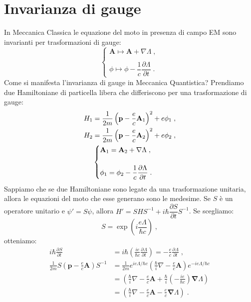 \documentclass[10pt,a4paper]{report}
\theoremstyle{definition}
\newcommand{\pdev}[3][]{\frac{\partial^{#1} #2}{\partial #3^{#1}}}
\numberwithin{equation}{section}
\newcommand{\bnabla}{\boldsymbol{\nabla}}
\begin{document}
\section{Invarianza di gauge}
In Meccanica Classica le equazione del moto in presenza di campo EM sono invarianti per trasformazioni di gauge:
\begin{equation}
\begin{cases}
\mathbf{A}\longmapsto \mathbf{A}+\nabla\Lambda\;, \\
\\
\phi\longmapsto \phi-\dfrac{1}{c}\dfrac{\partial\Lambda}{\partial t}\;.
\end{cases}
\end{equation}
Come si manifesta l'invarianza di gauge in Meccanica Quantistica? Prendiamo due Hamiltoniane di particella libera che differiscono per una trasformazione di gauge:
\begin{align}
H_1 &= \frac{1}{2m}\left(\mathbf{p}-\frac{e}{c}\mathbf{A}_1\right)^2+e\phi_1 \notag \;,\\
H_2 &= \frac{1}{2m}\left(\mathbf{p}-\frac{e}{c}\mathbf{A}_2\right)^2+e\phi_2 \notag\;, \\
&\begin{cases}
\mathbf{A}_1=\mathbf{A}_2+\nabla\Lambda\;, \\
\\
\phi_1=\phi_2-\dfrac{1}{c}\dfrac{\partial\Lambda}{\partial t}\;.
\end{cases}
\end{align}
Sappiamo che se due Hamiltoniane sono legate da una trasformazione unitaria, allora le equazioni del moto che esse generano sono le medesime. Se $S$ è un operatore unitario e $\psi'=S\psi$, allora $H'=SHS^{-1}+i\hbar\dfrac{\partial S}{\partial t}S^{-1}$. Se scegliamo:
\begin{equation}
S=\exp\left(i\frac{e\Lambda}{\hbar c}\right)\;,
\end{equation}
otteniamo:
\begin{align*}
i\hbar\pdev{S}{t}&= i\hbar\left(\frac{ie}{\hbar c}\pdev{\Lambda}{t}\right)=-\frac{e}{c}\pdev{\Lambda}{t}\;, \\
\frac{1}{2m}S\left(\mathbf{p}-\frac{e}{c}\mathbf{A}\right)S^{-1}&=\frac{1}{2m}e^{ie\Lambda/\hbar c}\left(\frac{\hbar}{i}\nabla-\frac{e}{c}\mathbf{A}\right)e^{-ie\Lambda/\hbar c} \\
&=\left(\frac{\hbar}{i}\nabla-\frac{e}{c}\mathbf{A}+\frac{\hbar}{i}\left(-\frac{ie}{\hbar c}\right)\bnabla\Lambda\right) \\
&=\left(\frac{\hbar}{i}\nabla-\frac{e}{c}\mathbf{A}-\frac{e}{c}\bnabla\Lambda\right)\;.
\end{align*}
\end{document}
